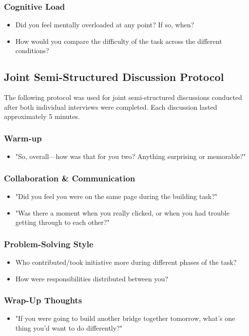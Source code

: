 \subsubsection{Cognitive Load}
\begin{itemize}
    \item Did you feel mentally overloaded at any point? If so, when?
    \item How would you compare the difficulty of the task across the different conditions?
\end{itemize}

\subsection{Joint Semi-Structured Discussion Protocol}
\label{appendix:joint-discussion}

The following protocol was used for joint semi-structured discussions conducted after both individual interviews were completed. Each discussion lasted approximately 5 minutes.

\subsubsection{Warm-up}
\begin{itemize}
    \item "So, overall---how was that for you two? Anything surprising or memorable?"
\end{itemize}

\subsubsection{Collaboration \& Communication}
\begin{itemize}
    \item "Did you feel you were on the same page during the building task?"
    \item "Was there a moment when you really clicked, or when you had trouble getting through to each other?"
\end{itemize}

\subsubsection{Problem-Solving Style}
\begin{itemize}
    \item Who contributed/took initiative more during different phases of the task?
    \item How were responsibilities distributed between you?
\end{itemize}

\subsubsection{Wrap-Up Thoughts}
\begin{itemize}
    \item "If you were going to build another bridge together tomorrow, what's one thing you'd want to do differently?"
\end{itemize} 